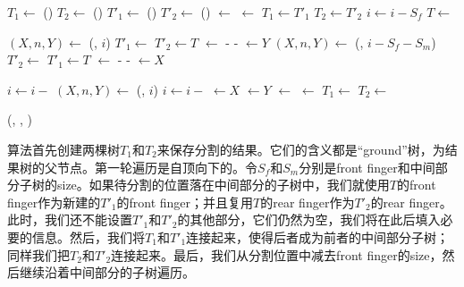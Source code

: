 \documentclass[UTF8]{article}
\begin{document}
\begin{algorithmic}
  \State $T_1 \gets$ ()
  \State $T_2 \gets$ ()
   
    \State $T'_1 \gets$ ()
    \State $T'_2 \gets$ ()
    \State {} $\gets$ 
    \State {} $\gets$ 
    \State {}
    \State {}
    \State $T_1 \gets T'_1$
    \State $T_2 \gets T'_2$
    \State $i \gets i - S_f$
    \State $T \gets$ 
  \EndWhile

    \State $(X, n, Y) \gets$ (, $i$)
    \State $T'_1 \gets$ 
    \State $T'_2 \gets T$
    \State {} $\gets$  -  - 
    \State {} $\gets Y$
    \State $(X, n, Y) \gets$ (, $i - S_f - S_m$)
    \State $T'_2 \gets$ 
    \State $T'_1 \gets T$
    \State {} $\gets$  -  - 
    \State {} $\gets X$
  \EndIf
  \State {}
  \State {}

  \State $i \gets i -$ 
   
    \State $(X, n, Y) \gets$ (, $i$)
    \State $i \gets i -$ 
    \State {} $\gets X$
    \State {} $\gets Y$
    \State {} $\gets$ 
    \State {} $\gets$ 
    \State $T_1 \gets$ 
    \State $T_2 \gets$ 
  \EndWhile

  \State \Return (, , )
\EndFunction
\end{algorithmic}

算法首先创建两棵树$T_1$和$T_2$来保存分割的结果。它们的含义都是“ground”树，为结果树的父节点。第一轮遍历是自顶向下的。令$S_f$和$S_m$分别是front finger和中间部分子树的size。如果待分割的位置落在中间部分的子树中，我们就使用$T$的front finger作为新建的$T'_1$的front finger；并且复用$T$的rear finger作为$T'_2$的rear finger。此时，我们还不能设置$T'_1$和$T'_2$的其他部分，它们仍然为空，我们将在此后填入必要的信息。然后，我们将$T_1$和$T'_1$连接起来，使得后者成为前者的中间部分子树；同样我们把$T_2$和$T'_2$连接起来。最后，我们从分割位置中减去front finger的size，然后继续沿着中间部分的子树遍历。
\end{document}
